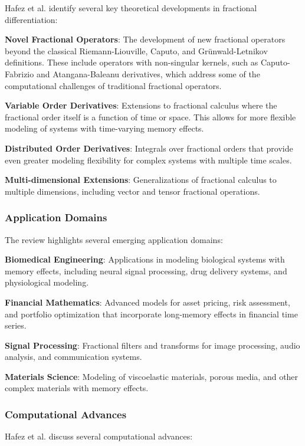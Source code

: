 Hafez et al. identify several key theoretical developments in fractional differentiation:

\textbf{Novel Fractional Operators}: The development of new fractional operators beyond the classical Riemann-Liouville, Caputo, and Grünwald-Letnikov definitions. These include operators with non-singular kernels, such as Caputo-Fabrizio and Atangana-Baleanu derivatives, which address some of the computational challenges of traditional fractional operators.

\textbf{Variable Order Derivatives}: Extensions to fractional calculus where the fractional order itself is a function of time or space. This allows for more flexible modeling of systems with time-varying memory effects.

\textbf{Distributed Order Derivatives}: Integrals over fractional orders that provide even greater modeling flexibility for complex systems with multiple time scales.

\textbf{Multi-dimensional Extensions}: Generalizations of fractional calculus to multiple dimensions, including vector and tensor fractional operations.

\subsubsection{Application Domains}

The review highlights several emerging application domains:

\textbf{Biomedical Engineering}: Applications in modeling biological systems with memory effects, including neural signal processing, drug delivery systems, and physiological modeling.

\textbf{Financial Mathematics}: Advanced models for asset pricing, risk assessment, and portfolio optimization that incorporate long-memory effects in financial time series.

\textbf{Signal Processing}: Fractional filters and transforms for image processing, audio analysis, and communication systems.

\textbf{Materials Science}: Modeling of viscoelastic materials, porous media, and other complex materials with memory effects.

\subsubsection{Computational Advances}

Hafez et al. discuss several computational advances:

